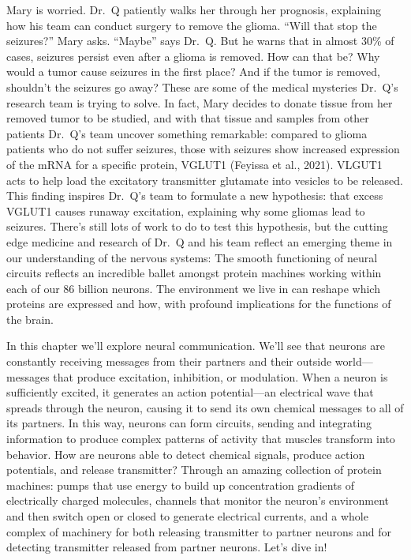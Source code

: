 \documentclass[
]{book}
\begin{document}
Mary is worried. Dr.~Q patiently walks her through her prognosis, explaining how his team can conduct surgery to remove the glioma. ``Will that stop the seizures?'' Mary asks. ``Maybe'' says Dr.~Q. But he warns that in almost 30\% of cases, seizures persist even after a glioma is removed. How can that be? Why would a tumor cause seizures in the first place? And if the tumor is removed, shouldn't the seizures go away? These are some of the medical mysteries Dr.~Q's research team is trying to solve. In fact, Mary decides to donate tissue from her removed tumor to be studied, and with that tissue and samples from other patients Dr.~Q's team uncover something remarkable: compared to glioma patients who do not suffer seizures, those with seizures show increased expression of the mRNA for a specific protein, VGLUT1 (Feyissa et al., 2021). VLGUT1 acts to help load the excitatory transmitter glutamate into vesicles to be released. This finding inspires Dr.~Q's team to formulate a new hypothesis: that excess VGLUT1 causes runaway excitation, explaining why some gliomas lead to seizures. There's still lots of work to do to test this hypothesis, but the cutting edge medicine and research of Dr.~Q and his team reflect an emerging theme in our understanding of the nervous systems: The smooth functioning of neural circuits reflects an incredible ballet amongst protein machines working within each of our 86 billion neurons. The environment we live in can reshape which proteins are expressed and how, with profound implications for the functions of the brain.

In this chapter we'll explore neural communication. We'll see that neurons are constantly receiving messages from their partners and their outside world---messages that produce excitation, inhibition, or modulation. When a neuron is sufficiently excited, it generates an action potential---an electrical wave that spreads through the neuron, causing it to send its own chemical messages to all of its partners. In this way, neurons can form circuits, sending and integrating information to produce complex patterns of activity that muscles transform into behavior. How are neurons able to detect chemical signals, produce action potentials, and release transmitter? Through an amazing collection of protein machines: pumps that use energy to build up concentration gradients of electrically charged molecules, channels that monitor the neuron's environment and then switch open or closed to generate electrical currents, and a whole complex of machinery for both releasing transmitter to partner neurons and for detecting transmitter released from partner neurons. Let's dive in!
\end{document}
